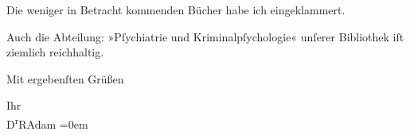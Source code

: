 \pstart
           Die weniger in Betracht kommenden Bücher habe ich eingeklammert.\pend
           
\pstart
           Auch die Abteilung: »Pſychiatrie und Kriminalpſychologie« unſerer Bibliothek iſt ziemlich reichhaltig.\pend
           
\pstart
           Mit ergebenſten Grüßen\pend
           
\pstart
           Ihr{\\[\baselineskip]}\spacefill\mbox{D\textsuperscript{r}RAdam}\pend
           \leftskip=0em{}\endnumbering{}  \newcommand{\dateiname}{L02294}\newcommand{\titel}{Robert Adam an Arthur Schnitzler, 10. 8. 1918}\newcommand{\editorInnen}{Martin Anton Müller und Gerd-Hermann Susen}
